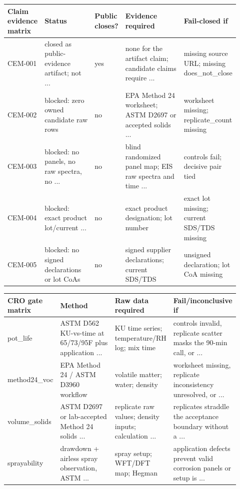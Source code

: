 \documentclass[10pt]{article}
\begin{document}
{\scriptsize\begin{longtable}{@{}p{0.10\linewidth} p{0.24\linewidth} p{0.09\linewidth} p{0.30\linewidth} p{0.19\linewidth}@{}}\toprule \textbf{Claim evidence matrix} & \textbf{Status} & \textbf{Public closes?} & \textbf{Evidence required} & \textbf{Fail-closed if} \\ \midrule CEM-001 & closed as public-evidence artifact; not ... & yes & none for the artifact claim; candidate claims require ... & missing source URL; missing does\_not\_close \\ CEM-002 & blocked: zero owned candidate raw rows & no & EPA Method 24 worksheet; ASTM D2697 or accepted solids ... & worksheet missing; replicate\_count missing \\ CEM-003 & blocked: no panels, no raw spectra, no ... & no & blind randomized panel map; EIS raw spectra and time ... & controls fail; decisive pair tied \\ CEM-004 & blocked: exact product lot/current ... & no & exact product designation; lot number & exact lot missing; current SDS/TDS missing \\ CEM-005 & blocked: no signed declarations or lot CoAs & no & signed supplier declarations; current SDS/TDS & unsigned declaration; lot CoA missing \\ \bottomrule\end{longtable}}
{\scriptsize\begin{longtable}{@{}p{0.18\linewidth} p{0.25\linewidth} p{0.24\linewidth} p{0.25\linewidth}@{}}\toprule \textbf{CRO gate matrix} & \textbf{Method} & \textbf{Raw data required} & \textbf{Fail/inconclusive if} \\ \midrule pot\_life & ASTM D562 KU-vs-time at 65/73/95F plus application ... & KU time series; temperature/RH log; mix time & controls invalid, replicate scatter masks the 90-min call, or ... \\ method24\_voc & EPA Method 24 / ASTM D3960 workflow & volatile matter; water; density & worksheet missing, replicate inconsistency unresolved, or ... \\ volume\_solids & ASTM D2697 or lab-accepted Method 24 solids ... & replicate raw values; density inputs; calculation ... & replicates straddle the acceptance boundary without a ... \\ sprayability & drawdown + airless spray observation, ASTM ... & spray setup; WFT/DFT map; Hegman & application defects prevent valid corrosion panels or setup is ... \\ \bottomrule\end{longtable}}
\end{document}
